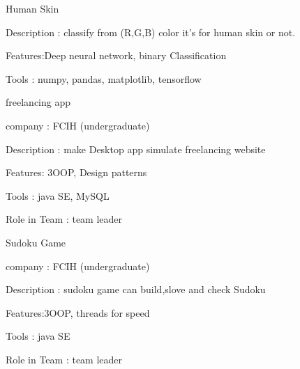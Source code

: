 \documentclass[a4paper,13pt,final]{memoir}
\newcommand{\SmallSep}{\vspace{0.5em}}
\begin{document}
\begin{compactitem}[\color{RoyalBlue}$\circ$]
		\item Human Skin
	\begin{compactitem}[\color{RoyalBlue}$\circ$]
		\item Description : classify from (R,G,B) color it's for human skin or not.
		\item Features:Deep neural network, binary Classification
		\item Tools : numpy, pandas, matplotlib, tensorflow
	\end{compactitem}
	\SmallSep

	\item freelancing app
	\begin{compactitem}[\color{RoyalBlue}$\circ$]
		\item company : FCIH (undergraduate)
		\item Description : make Desktop app simulate freelancing website
		\item Features: 3OOP, Design patterns
		\item Tools : java SE, MySQL
		\item Role in Team : team leader
	\end{compactitem}
	\SmallSep
	
	\item Sudoku Game
	\begin{compactitem}[\color{RoyalBlue}$\circ$]
		\item company : FCIH (undergraduate)
		\item Description : sudoku game can build,slove and check Sudoku
		\item Features:3OOP, threads for speed
		\item Tools : java SE
		\item Role in Team : team leader
	\end{compactitem}
	\SmallSep
\end{compactitem}
\clearpage
\end{document}
